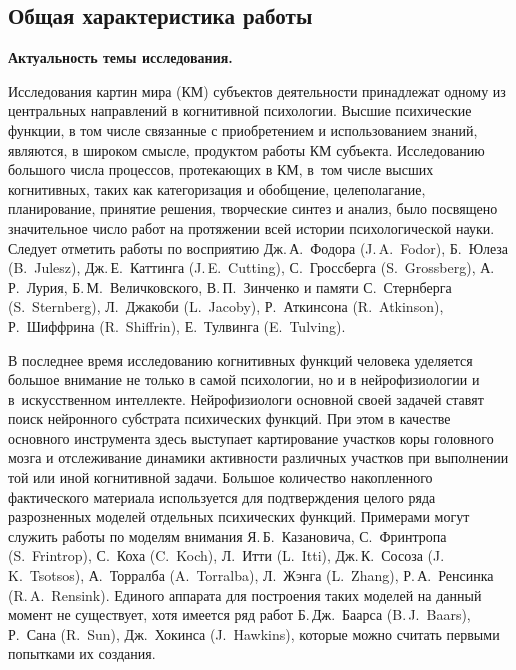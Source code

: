 \subsection*{\Large Общая характеристика работы}
\fontsize{14pt}{15pt}\selectfont

\textbf{Актуальность темы исследования.} 

Исследования картин мира (КМ) субъектов деятельности принадлежат одному из центральных направлений в когнитивной психологии. Высшие психические функции, в том числе связанные с приобретением и использованием знаний, являются, в широком смысле, продуктом работы КМ субъекта. Исследованию большого числа процессов, протекающих в КМ, в~том числе высших когнитивных, таких как категоризация и обобщение, целеполагание, планирование, принятие решения, творческие синтез и анализ, было посвящено значительное число работ на протяжении всей истории психологической науки. Следует отметить работы по восприятию Дж.\,А.~Фодора (J.\,A.~Fodor), Б.~Юлеза (B.~Julesz), Дж.\,Е.~Каттинга (J.\,E.~Cutting), С.~Гроссберга (S.~Grossberg), А.\,Р.~Лурия, Б.\,М.~Величковского, В.\,П.~Зинченко и памяти С.~Стернберга (S.~Sternberg), Л.~Джакоби (L.~Jacoby), Р.~Аткинсона (R.~Atkinson), Р.~Шиффрина (R.~Shiffrin), Е.~Тулвинга (E.~Tulving).

В последнее время исследованию когнитивных функций человека уделяется большое внимание не только в самой психологии, но и в нейрофизиологии и в~искусственном интеллекте. Нейрофизиологи основной своей задачей ставят поиск нейронного субстрата психических функций. При этом в качестве основного инструмента здесь выступает картирование участков коры головного мозга и отслеживание динамики активности различных участков при выполнении той или иной когнитивной задачи. Большое количество накопленного фактического материала используется для подтверждения целого ряда разрозненных моделей отдельных психических функций. Примерами могут служить работы по моделям внимания Я.\,Б.~Казановича, С.~Фринтропа (S.~Frintrop), С.~Коха (C.~Koch), Л.~Итти (L.~Itti), Дж.\,К.~Сосоза (J.\,K.~Tsotsos), А.~Торралба (A.~Torralba), Л.~Жэнга (L.~Zhang), Р.\,А.~Ренсинка (R.\,A.~Rensink). Единого аппарата для построения таких моделей на данный момент не существует, хотя имеется ряд работ Б.\,Дж.~Баарса (B.\,J.~Baars), Р.~Сана (R.~Sun), Дж.~Хокинса (J.~Hawkins), которые можно считать первыми попытками их создания.

